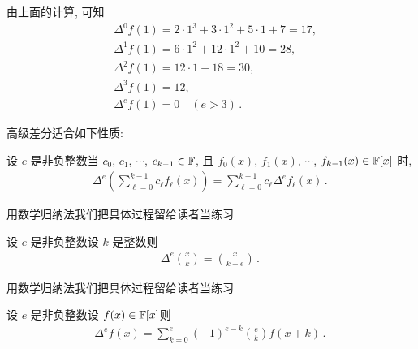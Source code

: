 \begin{example}
    由上面的计算, 可知
    \begin{align*}
         & \Delta^0 f(1) = 2 \cdot 1^3 + 3 \cdot 1^2 + 5 \cdot 1 + 7 = 17, \\
         & \Delta^1 f(1) = 6 \cdot 1^2 + 12 \cdot 1^2 + 10 = 28,           \\
         & \Delta^2 f(1) = 12 \cdot 1 + 18 = 30,                           \\
         & \Delta^3 f(1) = 12,                                             \\
         & \Delta^e f(1) = 0 \quad (e > 3) \period
    \end{align*}
\end{example}

高级差分适合如下性质:

\begin{proposition}
    设 $e$ 是非负整数\period 当 $c_0$, $c_1$, $\cdots$, $c_{k-1} \in \mathbb{F}$, 且 $f_0 (x)$, $f_1 (x)$, $\cdots$, $f_{k-1} (x) \in \mathbb{F}[x]$ 时,
    \begin{align*}
        \Delta^e \left( \sum_{\ell = 0}^{k-1} c_\ell f_\ell (x) \right)
        = \sum_{\ell = 0}^{k-1} c_\ell \Delta^e f_\ell (x) \period
    \end{align*}
\end{proposition}

\begin{pf}
    用数学归纳法\period 我们把具体过程留给读者当练习\period
\end{pf}

\begin{proposition}
    设 $e$ 是非负整数\period 设 $k$ 是整数\period 则
    \begin{align*}
        \Delta^e \binom{x}{k} = \binom{x}{k - e} \period
    \end{align*}
\end{proposition}

\begin{pf}
    用数学归纳法\period 我们把具体过程留给读者当练习\period
\end{pf}

\begin{proposition}
    设 $e$ 是非负整数\period 设 $f(x) \in \mathbb{F}[x]$\period 则
    \begin{align*}
        \Delta^e f(x) = \sum_{k = 0}^{e} (-1)^{e-k} \binom{e}{k} f(x+k) \period
    \end{align*}
\end{proposition}

